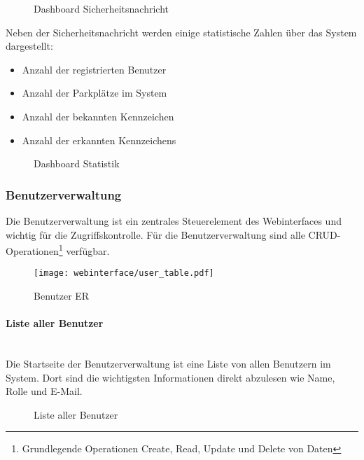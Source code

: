 \begin{figure}[H]
  \centering
  \caption{Dashboard Sicherheitsnachricht}
\end{figure}

Neben der Sicherheitsnachricht werden einige statistische Zahlen über das System
dargestellt:

\begin{itemize}
  \item Anzahl der registrierten Benutzer
  \item Anzahl der Parkplätze im System
  \item Anzahl der bekannten Kennzeichen
  \item Anzahl der erkannten Kennzeichens
\end{itemize}

\begin{figure}[H]
  \centering
  \caption{Dashboard Statistik}
\end{figure}

\subsubsection{Benutzerverwaltung}

Die Benutzerverwaltung ist ein zentrales Steuerelement des Webinterfaces und wichtig
für die Zugriffskontrolle. Für die Benutzerverwaltung sind alle
CRUD-Operationen\footnote{Grundlegende Operationen Create, Read, Update und
Delete von Daten} verfügbar.

\begin{figure}[H]
  \centering
  \texttt{[image: webinterface/user\_table.pdf]}
  \caption{Benutzer ER}
\end{figure}

\paragraph{Liste aller Benutzer}\mbox{}\\

Die Startseite der Benutzerverwaltung ist eine Liste von allen Benutzern im
System. Dort sind die wichtigsten Informationen direkt abzulesen wie Name, Rolle
und E-Mail.

\begin{figure}[H]
  \centering
  \caption{Liste aller Benutzer}
\end{figure}

